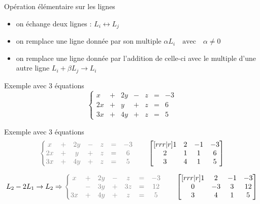 \documentclass[french]{beamer}
\begin{document}
\begin{frame}{Opération élémentaire sur les lignes}
\begin{itemize}
	\item on échange deux lignes :  $ L_i \leftrightarrow L_j$
	\item on remplace une ligne donnée par son multiple
	$ \alpha L_i  \quad \mbox{avec} \quad\alpha \ne 0$
	\item  on remplace une ligne donnée par l'addition de celle-ci avec le multiple d'une autre ligne
	$L_i + \beta L_j \rightarrow L_i$
\end{itemize}
\end{frame}


\begin{frame}{Exemple avec 3 équations}
\[
	\left\{
	\begin{matrix}
	x &+& 2y &-& z &=& -3\\
	2x &+& y &+& z &=& 6\\
	3x &+& 4y &+& z &=& 5
	\end{matrix}\right.
\]
\end{frame}

\begin{frame}{Exemple avec 3 équations}
\[\color{gray}
\left\{
	\begin{matrix}
	x &+& 2y &-& z &=& -3\\
	2x &+& y &+& z &=& 6\\
	3x &+& 4y &+& z &=& 5
	\end{matrix}\right.
	\qquad\color{black}
	\begin{bmatrix}[rrr|r]
1 & 2 & -1 & -3 \\
2 & 1 & 1 & 6 \\
3 & 4 & 1 & 5
\end{bmatrix}
\color{black}
\]

\[
L_2 -2L_1 \rightarrow L_2 \Rightarrow
\color{gray}
\left\{
	\begin{matrix}
	x &+& 2y &-& z &=& -3\\
	 &-& 3y &+& 3z &=& 12\\
	3x &+& 4y &+& z &=& 5
	\end{matrix}\right.
	\qquad\color{black}
	\begin{bmatrix}[rrr|r]
1 & 2 & -1 & -3 \\
0 & -3 & 3 & 12 \\
3 & 4 & 1 & 5
\end{bmatrix}
\]
\end{frame}
\end{document}
